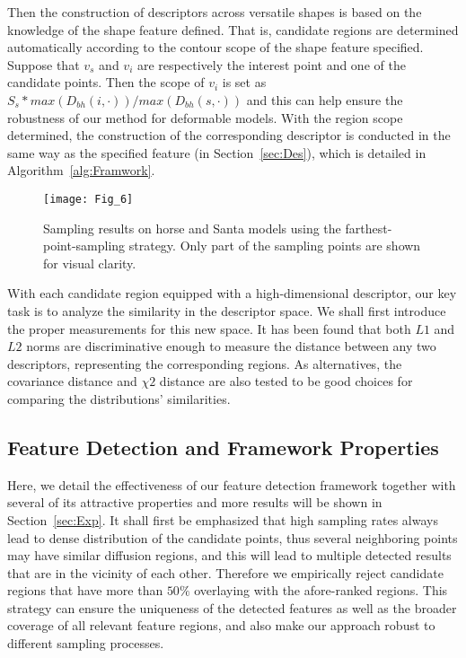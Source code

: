 Then the construction of descriptors across versatile shapes is based
on the knowledge of the shape feature defined. That is, candidate
regions are determined automatically according to the contour scope of
the shape feature specified. Suppose that $v_{s}$ and $v_{i}$ are
respectively the interest point and one of the candidate points. Then
the scope of $v_{i}$ is set as
$S_{s}*max(D_{bh}(i,\cdot))/max(D_{bh}(s,\cdot))$ and this can help
ensure the robustness of our method for deformable models.  With the
region scope determined, the construction of the corresponding
descriptor is conducted in the same way as the specified feature (in
Section~\ref{sec:Des}), which is detailed in
Algorithm~\ref{alg:Framwork}.

\begin{figure}[!to]
\begin{center}
\texttt{[image: Fig\_6]}
\end{center}
\caption[Point sampling on the horse and Santa models.]
  {Sampling results on horse and Santa models using the
  farthest-point-sampling strategy. Only part of the sampling points
  are shown for visual clarity.}
\label{Sampling}
\end{figure}

With each candidate region equipped with a high-dimensional
descriptor, our key task is to analyze the similarity in the
descriptor space. We shall first introduce the proper measurements
for this new space. It has been found that both $L1$ and $L2$ norms
are discriminative enough to measure the distance between any two
descriptors, representing the corresponding regions. As alternatives,
the covariance distance and $\chi{2}$ distance are also tested to be
good choices for comparing the distributions' similarities.

\subsection{Feature Detection and Framework Properties}

Here, we detail the effectiveness of our feature detection framework
together with several of its attractive properties and more results
will be shown in Section~\ref{sec:Exp}. It shall first be emphasized
that high sampling rates always lead to dense distribution of the
candidate points, thus several neighboring points may have similar
diffusion regions, and this will lead to multiple detected results
that are in the vicinity of each other. Therefore we empirically
reject candidate regions that have more than $50\%$ overlaying with
the afore-ranked regions. This strategy can ensure the uniqueness of
the detected features as well as the broader coverage of all relevant
feature regions, and also make our approach robust to different
sampling processes.

